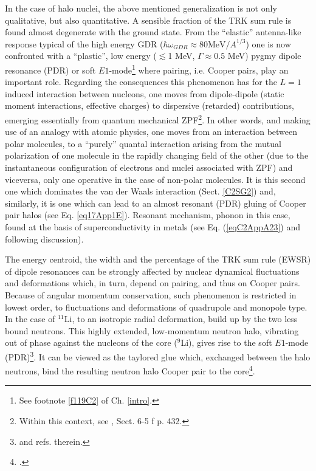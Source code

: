 In the case of halo nuclei, the above mentioned generalization is not only qualitative, but also  quantitative. A sensible fraction of the TRK sum rule is found almost degenerate with the ground state. From the ``elastic'' antenna-like response typical of the high energy GDR ($\hbar\omega_{GDR}\approx80\text{MeV}/A^{1/3}$)  one is now confronted with a ``plastic'', low energy ($\lesssim$1 MeV, $\Gamma\approx0.5$ MeV)  pygmy dipole resonance (PDR) or soft $E1$-mode\footnote{See footnote \ref{f119C2} of Ch. \ref{intro}.} where pairing, i.e. Cooper pairs, play an important role. Regarding the consequences this phenomenon has for the $L=1$ induced interaction between nucleons, one moves from dipole-dipole (static moment interactions, effective charges) to dispersive (retarded) contributions, emerging essentially from quantum mechanical ZPF\footnote{Within this context, see \cite{Bohr:75}, Sect. 6-5 f p. 432.}. In other words, and making use of an analogy with atomic physics, one moves from an interaction between polar molecules, to a ``purely'' quantal interaction arising from the mutual polarization of one molecule in the rapidly changing field of the other (due to the instantaneous configuration of electrons and nuclei associated with ZPF) and viceversa, only one operative in the case of non-polar molecules. It is this second one which dominates the van der Waals interaction 
 (Sect. \ref{C2SG2}) and, similarly, it is one which can lead to an almost resonant (PDR) gluing of Cooper pair halos (see Eq. \ref{eq17App1E}). Resonant mechanism, phonon in this case,  found  at the basis of superconductivity in metals (see Eq. (\ref{eqC2AppA23}) and  following discussion). 

  The energy centroid, the width and the percentage of the TRK sum rule (EWSR) of dipole resonances can be strongly affected by nuclear dynamical fluctuations and deformations which, in turn, depend on pairing, and thus on Cooper pairs. Because of angular momentum conservation, such phenomenon is restricted in lowest order, to fluctuations and deformations of quadrupole and monopole type. In the case of $^{11}$Li, to an isotropic radial deformation, build up by the two less bound neutrons. This highly extended, low-momentum neutron halo, vibrating out of phase against the nucleons of the core ($^9$Li), gives rise to the soft $E1$-mode (PDR)\footnote{\cite{Broglia:19} and refs. therein.}.  It can be viewed as the taylored glue 
   which, exchanged between the halo neutrons, bind the resulting neutron halo Cooper pair to the core\footnote{\cite{Barranco:01}.}.


